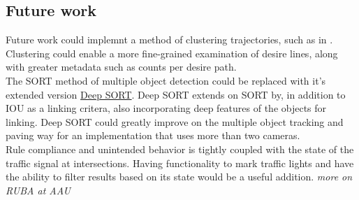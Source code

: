 \subsection{Future work}
Future work could implemnt a method of clustering trajectories,
such as in \cite{gariel_trajectory_2011}. Clustering could enable a more fine-grained examination of desire lines,
along with greater metadata such as counts per desire path.
\ \\

The SORT method of multiple object detection could be replaced with it's extended version \href{https://github.com/nwojke/deep_sort}{Deep SORT}.
Deep SORT extends on SORT by, in addition to IOU as a linking critera, also incorporating
deep features of the objects for linking. Deep SORT could greatly improve on the multiple object tracking
and paving way for an implementation that uses more than two cameras.
\ \\

Rule compliance and unintended behavior is tightly coupled with the state of the traffic signal at intersections. 
Having functionality to mark traffic lights and have the ability to filter results based on its state would
be a useful addition. \textit{more on RUBA at AAU}